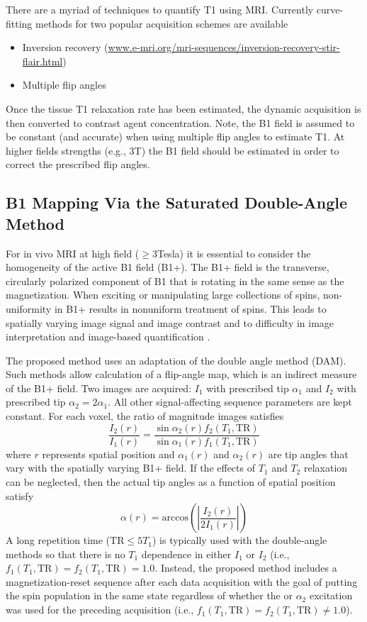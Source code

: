 \documentclass[article]{jss}
\begin{document}
There are a myriad of techniques to quantify T1 using MRI.  Currently
curve-fitting methods for two popular acquisition schemes are
available
\begin{itemize}
\item Inversion recovery (\url{www.e-mri.org/mri-sequences/inversion-recovery-stir-flair.html})
\item Multiple flip angles \citep{par-pad:DCE-MRI}
\end{itemize}
Once the tissue T1 relaxation rate has been estimated, the dynamic
acquisition is then converted to contrast agent concentration.  Note,
the B1 field is assumed to be constant (and accurate) when using
multiple flip angles to estimate T1.  At higher fields strengths
(e.g., 3T) the B1 field should be estimated in order to correct the
prescribed flip angles.

\subsection{B1 Mapping Via the Saturated Double-Angle Method}

For in vivo MRI at high field ($\geq{3}$Tesla) it is essential to
consider the homogeneity of the active B1 field (B1+).  The B1+ field
is the transverse, circularly polarized component of B1 that is
rotating in the same sense as the magnetization.  When exciting or
manipulating large collections of spins, non-uniformity in B1+ results
in nonuniform treatment of spins.  This leads to spatially varying
image signal and image contrast and to difficulty in image
interpretation and image-based quantification
\citep{cun-pau-nay:saturated}.

The proposed method uses an adaptation of the double angle method
(DAM).  Such methods allow calculation of a flip-angle map, which is
an indirect measure of the B1+ field.  Two images are acquired:
$I_1$ with prescribed tip $\alpha_1$ and $I_2$ with prescribed tip
$\alpha_2=2\alpha_1$.  All other signal-affecting sequence parameters
are kept constant. For each voxel, the ratio of magnitude images
satisfies
\begin{equation*}
  \frac{I_2(r)}{I_1(r)} =
  \frac{\sin\alpha_2(r)f_2(T_1,\text{TR})}{\sin\alpha_1(r)f_1(T_1,\text{TR})}
\end{equation*}
where $r$ represents spatial position and $\alpha_1(r)$ and
$\alpha_2(r)$ are tip angles that vary with the spatially varying B1+
field.  If the effects of $T_1$ and $T_2$ relaxation can be neglected,
then the actual tip angles as a function of spatial position satisfy
\begin{equation*}
  \alpha(r) = \text{arccos}\left(\left|\frac{I_2(r)}{2I_1(r)}\right|\right)
\end{equation*}
A long repetition time ($\text{TR}\leq{5T_1}$) is typically used with
the double-angle methods so that there is no $T_1$ dependence in
either $I_1$ or $I_2$ (i.e.,
$f_1(T_1,\text{TR})=f_2(T_1,\text{TR})=1.0$.  Instead, the proposed
method includes a magnetization-reset sequence after each data
acquisition with the goal of putting the spin population in the same
state regardless of whether the or $\alpha_2$ excitation was used for
the preceding acquisition (i.e.,
$f_1(T_1,\text{TR})=f_2(T_1,\text{TR})\ne{1.0}$).
\end{document}
